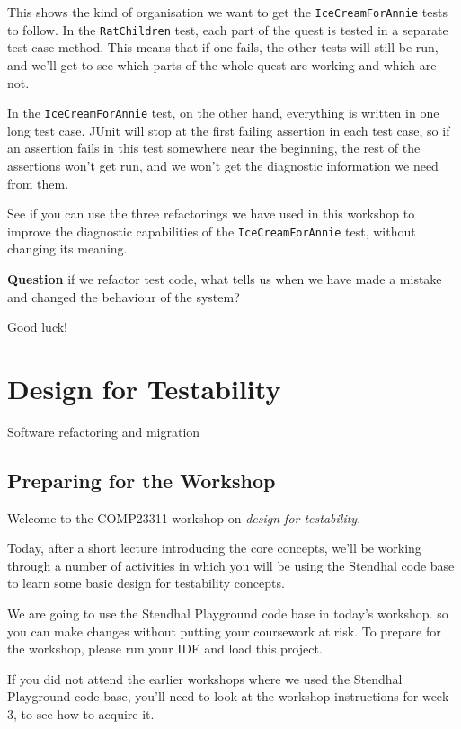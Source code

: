 \documentclass[
]{book}
\begin{document}
This shows the kind of organisation we want to get the \texttt{IceCreamForAnnie} tests to follow. In the \texttt{RatChildren} test, each part of the quest is tested in a separate test case method. This means that if one fails, the other tests will still be run, and we'll get to see which parts of the whole quest are working and which are not.

In the \texttt{IceCreamForAnnie} test, on the other hand, everything is written in one long test case. JUnit will stop at the first failing assertion in each test case, so if an assertion fails in this test somewhere near the beginning, the rest of the assertions won't get run, and we won't get the diagnostic information we need from them.

See if you can use the three refactorings we have used in this workshop to improve the diagnostic capabilities of the \texttt{IceCreamForAnnie} test, without changing its meaning.

\textbf{Question} if we refactor test code, what tells us when we have made a mistake and changed the behaviour of the system?

Good luck!

\hypertarget{designing}{%
\chapter{Design for Testability}\label{designing}}

Software refactoring and migration

\hypertarget{preparing-for-the-workshop-1}{%
\section{Preparing for the Workshop}\label{preparing-for-the-workshop-1}}

Welcome to the COMP23311 workshop on \emph{design for testability}.

Today, after a short lecture introducing the core concepts, we'll be working through a number of activities in which you will be using the Stendhal code base to learn some basic design for testability concepts.

We are going to use the Stendhal Playground code base in today's workshop. so you can make changes without putting your coursework at risk. To prepare for the workshop, please run your IDE and load this project.

If you did not attend the earlier workshops where we used the Stendhal Playground code base, you'll need to look at the workshop instructions for week 3, to see how to acquire it.
\end{document}
